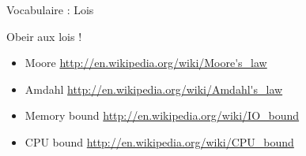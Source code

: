 \begin{Frame}{Vocabulaire : Lois}
  \begin{block}{Obeir aux lois !}
  \begin{itemize}
  \item Moore \url{http://en.wikipedia.org/wiki/Moore's_law}
  \item Amdahl \url{http://en.wikipedia.org/wiki/Amdahl's_law}
  \item Memory bound \url{http://en.wikipedia.org/wiki/IO_bound}
  \item CPU bound \url{http://en.wikipedia.org/wiki/CPU_bound}
  \end{itemize}
  \end{block}
\end{Frame}


